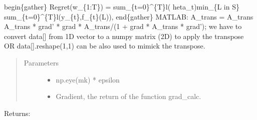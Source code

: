\documentclass[letterpaper,10pt,english]{sphinxmanual}
\begin{document}
\begin{fulllineitems}
\label{\detokenize{LDS:LDS.OnlineLDS_library.A_trans_calc}}
\sphinxAtStartPar
begin\{gather\}
Regret(w\_\{1:T\}) = sum\_\{t=0\}\textasciicircum{}\{T\}l(  heta\_t)\sphinxhyphen{}min\_\{L in S\} sum\_\{t=0\}\textasciicircum{}\{T\}l(y\_\{t\},f\_\{t\}(L)),
end\{gather\}
MATLAB:
A\_trans = A\_trans \sphinxhyphen{} A\_trans * grad’ * grad * A\_trans/(1 + grad * A\_trans * grad’);
we have to convert data{[}{]} from 1D vector to a numpy matrix (2D) to apply the transpose
OR data{[}{]}.reshape(\sphinxhyphen{}1,1) can be also used to mimick the transpose.
\begin{quote}\begin{description}
\item[{Parameters}] \leavevmode\begin{itemize}
\item {} 
\sphinxAtStartPar
{} \textendash{} np.eye(mk) * epsilon

\item {} 
\sphinxAtStartPar
{} \textendash{} Gradient, the return of the function grad\_calc.

\end{itemize}

\end{description}\end{quote}

\sphinxAtStartPar
Returns:

\end{fulllineitems}

\end{document}
